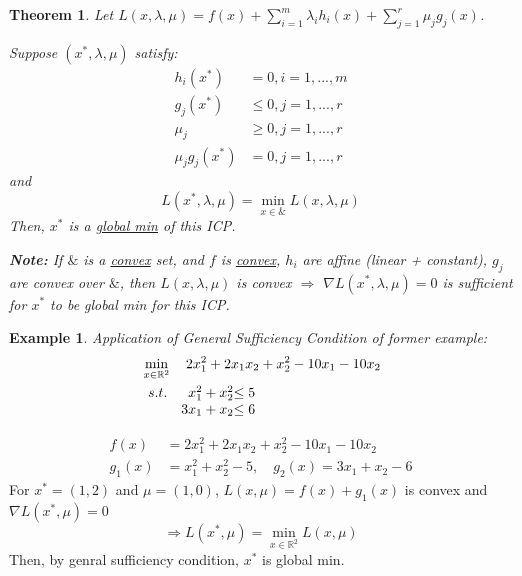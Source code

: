 \documentclass[11pt,a4paper]{article}
\newtheorem{theorem}{Theorem}
\newtheorem{example}{Example}
\begin{document}
\begin{theorem}
    Let $L(x,\lambda,\mu)=f(x)+\sum_{i=1}^m\lambda_i h_i(x)+\sum_{j=1}^r\mu_j g_j(x)$.

    Suppose $(x^*,\lambda,\mu)$ satisfy:
    \begin{equation}
        \begin{aligned}
            h_i(x^*)&=0,i=1,...,m\\
            g_j(x^*)&\leq 0,j=1,...,r\\
            \mu_j&\geq 0,j=1,...,r\\
            \mu_jg_j(x^*)&=0,j=1,...,r
        \end{aligned}
        \nonumber
    \end{equation}
    and $$L(x^*,\lambda,\mu)=\min_{x\in\&}L(x,\lambda,\mu)$$
    Then, $x^*$ is a \underline{global min} of this ICP.

    \textbf{Note:} If $\&$ is a \underline{convex} set, and $f$ is \underline{convex}, $h_i$ are affine (linear + constant), $g_j$ are convex over $\&$, then $L(x,\lambda,\mu)$ is convex $\Rightarrow$ $\nabla L(x^*,\lambda,\mu)=0$ is sufficient for $x^*$ to be global min for this ICP.
\end{theorem}



\begin{example}
Application of General Sufficiency Condition of former example:
    \begin{align*}
        &\min_{x\in \mathbb{R}^2}\quad 2x_1^2+2x_1x_2+x_2^2-10x_1-10x_2\\
        &\begin{array}{r@{\quad}r@{}l@{\quad}l}
        s.t.
        &x_1^2+x_2^2&\leq 5\\
        &3x_1+x_2&\leq 6\\
    \end{array}
    \end{align*}
\end{example}
\begin{equation}
    \begin{aligned}
        f(x)&=2x_1^2+2x_1x_2+x_2^2-10x_1-10x_2\\
        g_1(x)&=x_1^2+x_2^2-5,\quad g_2(x)=3x_1+x_2-6
    \end{aligned}
    \nonumber
\end{equation}
For $x^*=(1,2)$ and $\mu=(1,0)$, $L(x,\mu)=f(x)+g_1(x)$ is convex and $\nabla L(x^*,\mu)=0$
$$\Rightarrow L(x^*,\mu)=\min_{x\in \mathbb{R}^2}L(x,\mu)$$
Then, by genral sufficiency condition, $x^*$ is global min.
\end{document}
